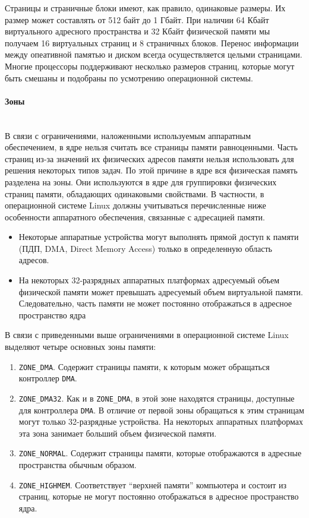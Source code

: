 \documentclass[12pt]{article}
\begin{document}
Страницы и страничные блоки имеют,
как правило, одинаковые размеры. Их размер может составлять от 512 байт до 1 Гбайт.
При наличии 64 Кбайт виртуального адресного пространства и 32 Кбайт физической памяти мы получаем 16 виртуальных страниц
и 8 страничных блоков. Перенос информации между опеативной памятью и диском всегда осуществляется целыми страницами.
Многие процессоры поддерживают несколько размеров страниц, которые могут быть смешаны и подобраны по усмотрению операционной системы.

\paragraph*{Зоны} ~\\

В связи с ограничениями, наложенными используемым аппаратным обеспечением,
в ядре нельзя считать все страницы памяти равноценными. Часть страниц из-за значений
их физических адресов памяти нельзя использовать для решения некоторых типов задач.
По этой причине в ядре вся физическая память разделена на зоны. Они используются в ядре для группировки физических страниц памяти, обладающих одинаковыми свойствами.
В частности, в операционной системе Linux должны учитываться перечисленные ниже
особенности аппаратного обеспечения, связанные с адресацией памяти.
\begin{itemize}
    \item Некоторые аппаратные устройства могут выполнять прямой доступ к памяти
          (ПДП, DMA, Direct Memory Access) только в определенную область адресов.
    \item На некоторых 32-разрядных аппаратных платформах адресуемый объем физической памяти может превышать адресуемый объем виртуальной памяти.
          Следовательно, часть памяти не может постоянно отображаться в адресное пространство ядра
\end{itemize}

В связи с приведенными выше ограничениями в операционной системе Linux выделяют четыре основных зоны памяти:
\begin{enumerate}
    \item \verb!ZONE_DMA!. Содержит страницы памяти, к которым может обращаться контроллер \verb!DMA!.
    \item \verb!ZONE_DMA32!. Как и в \verb!ZONE_DMA!, в этой зоне находятся страницы, доступные
    для контроллера \verb!DMA!. В отличие от первой зоны обращаться к этим страницам
    могут только 32-разрядные устройства. На некоторых аппаратных платформах
    эта зона занимает больший объем физической памяти.
    \item \verb!ZONE_NORMAL!. Содержит страницы памяти, которые отображаются в адресные
    пространства обычным образом.
    \item \verb!ZONE_HIGHMEM!. Соответствует “верхней памяти” компьютера и состоит из страниц, которые не могут постоянно отображаться в адресное пространство ядра.
\end{enumerate}
\end{document}
